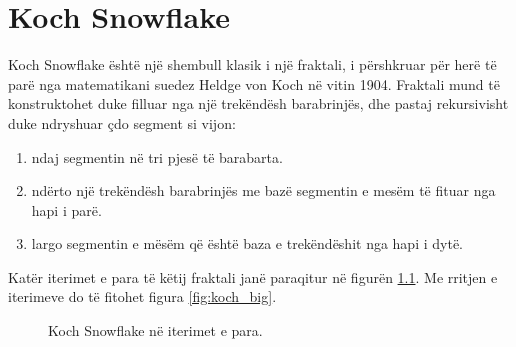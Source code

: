 \chapter{Koch Snowflake}

\noindent Koch Snowflake është një shembull klasik i një fraktali, i përshkruar për herë të parë nga matematikani suedez Heldge von Koch në vitin 1904. Fraktali mund të konstruktohet duke filluar nga një trekëndësh barabrinjës, dhe pastaj rekursivisht duke ndryshuar çdo segment si vijon:

\begin{enumerate}
    \item ndaj segmentin në tri pjesë të barabarta.
    \item ndërto një trekëndësh barabrinjës me bazë segmentin e mesëm të fituar nga hapi i parë.
    \item largo segmentin e mësëm  që është baza e trekëndëshit nga hapi i dytë.
\end{enumerate}

\noindent Katër iterimet e para të këtij fraktali janë paraqitur në  figurën \ref{fig:koch_4}. Me rritjen e iterimeve do të fitohet figura \ref{fig:koch_big}.

\begin{figure}[htbp!]
\hfill
{}
\hfill
{}
\hfill
{}
\hfill
{}
\hfill
\caption{Koch Snowflake në iterimet e para.}
\label{fig:koch_4}
\end{figure}

